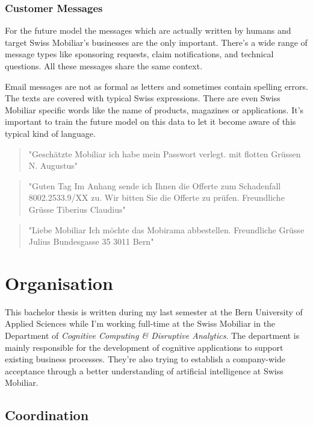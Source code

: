 \subsubsection{Customer Messages}

For the future model the messages which are actually written by humans and target Swiss Mobiliar's businesses are the only important.
There's a wide range of message types like sponsoring requests, claim notifications, and technical questions. All these messages
share the same context.

Email messages are not as formal as letters and sometimes contain spelling errors. The texts are covered with typical Swiss expressions.
There are even Swiss Mobiliar specific words like the name of products, magazines or applications. It's important to train the future
model on this data to let it become aware of this typical kind of language.

\begin{quote}
    "Geschätzte Mobiliar ich habe mein Passwort verlegt. mit flotten Grüssen N. Augustus"
\end{quote}

\begin{quote}
    "Guten Tag Im Anhang sende ich Ihnen die Offerte zum Schadenfall 8002.2533.9/XX zu. Wir bitten Sie die Offerte zu prüfen. Freundliche Grüsse Tiberius Claudius"
\end{quote}

\begin{quote}
    "Liebe Mobiliar Ich möchte das Mobirama abbestellen. Freundliche Grüsse Julius Bundesgasse 35 3011 Bern"
\end{quote}

\section{Organisation}

This bachelor thesis is written during my last semester at the Bern University of Applied Sciences while I'm working full-time
at the Swiss Mobiliar in the Department of \emph{Cognitive Computing \& Disruptive Analytics}. The department is mainly responsible
for the development of cognitive applications to support existing business processes. They're also trying to establish a
company-wide acceptance through a better understanding of artificial intelligence at Swiss Mobiliar.

\subsection{Coordination}

